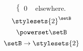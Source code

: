 \begin{forslides}
\begin{equation}
\begin{cases}
            0 & \text{ elsewhere}.
        \end{cases}
    \end{equation}
    \begin{equation}
        \label{eq:slides_session2_195}
        \stylesets{2}^\setB
    \end{equation}
    \begin{equation}
        \label{eq:slides_session2_196}
        \powerset \setB
    \end{equation}
    \begin{equation}
        \label{eq:slides_session2_197}
        \setB \to \stylesets{2}
    \end{equation}

\end{forslides}

